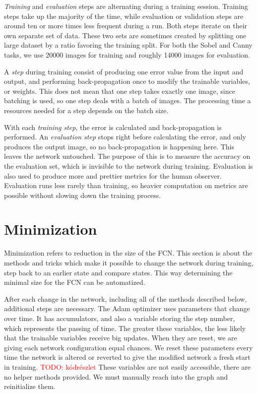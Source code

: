 \documentclass[12pt]{report}
\newcommand\todo[1]{\textcolor{red}{#1}}
\begin{document}
\textit{Training} and \textit{evaluation} steps are alternating during a training session. Training steps take up the majority of the time, while evaluation or validation steps are around ten or more times less frequent during a run. Both steps iterate on their own separate set of data. These two sets are sometimes created by splitting one large dataset by a ratio favoring the training split. For both the Sobel and Canny tasks, we use 20000 images for training and roughly 14000 images for evaluation.

A \textit{step} during training consist of producing one error value from the input and output, and performing back-propagation once to modify the trainable variables, or weights. This does not mean that one step takes exactly one image, since batching is used, so one step deals with a batch of images. The processing time a resources needed for a step depends on the batch size.

With each \textit{training step}, the error is calculated and back-propagation is performed. An \textit{evaluation step} stops right before calculating the error, and only produces the output image, so no back-propagation is happening here. This leaves the network untouched. The purpose of this is to measure the accuracy on the evaluation set, which is invisible to the network during training. Evaluation is also used to produce more and prettier metrics for the human observer. Evaluation runs less rarely than training, so heavier computation on metrics are possible without slowing down the training process.
\section{Minimization}
Minimization refers to reduction in the size of the FCN. This section is about the methods and tricks which make it possible to change the network during training, step back to an earlier state and compare states. This way determining the minimal size for the FCN can be automatized.

After each change in the network, including all of the methods described below, additional steps are necessary. The Adam \cite{adam} optimizer uses parameters that change over time. It has accumulators, and also a variable storing the step number, which represents the passing of time. The greater these variables, the less likely that the trainable variables receive big updates. When they are reset, we are giving each network configuration equal chances. We reset these parameters every time the network is altered or reverted to give the modified network a fresh start in training. \todo{TODO: kódrészlet} These variables are not easily accessible, there are no helper methods provided. We must manually reach into the graph and reinitialize them.
\end{document}
